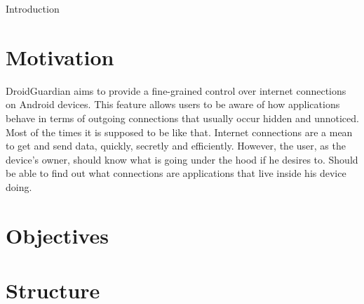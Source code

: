 Introduction

\section{Motivation}
\label{sec:motivation}

DroidGuardian aims to provide a fine-grained control over internet connections on Android devices. This feature allows users to be aware of how applications behave in terms of outgoing connections that usually occur hidden and unnoticed. Most of the times it is supposed to be like that. Internet connections are a mean to get and send data, quickly, secretly and efficiently. However, the user, as the device's owner, should know what is going under the hood if he desires to. Should be able to find out what connections are applications that live inside his device doing.


\section{Objectives}
\label{sec:objectives}


\section{Structure}

